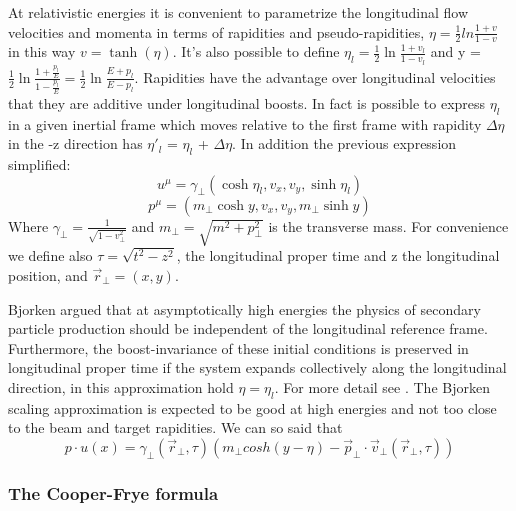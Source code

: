 \documentclass[12pt,a4paper]{book}
\begin{document}
	At relativistic energies it is convenient to parametrize the longitudinal flow velocities and momenta in terms of rapidities and pseudo-rapidities, $\eta= \frac{1}{2} ln \frac{1+v}{1-v}$ in this way $v = \tanh (\eta)$. It's also possible to define $\eta_l = \frac{1}{2} \ln \frac{1+v_l}{1-v_l}$ and y = $\frac{1}{2} \ln \frac{1+\frac{p_l}{E}}{1-\frac{p_l}{E}}= \frac{1}{2} \ln \frac{E+p_l}{E -p _l}$.  Rapidities have the advantage over longitudinal velocities that they are additive under longitudinal boosts. In fact is possible to express $\eta_l$ in a given inertial frame which moves relative to the first frame with rapidity $\Delta \eta$ in the -z direction has $\eta'_l$ = $\eta_l$ + $\Delta \eta$. In addition the previous expression simplified:
	\begin{equation}
		u^\mu=\gamma_\perp(\cosh \eta_l,v_x,v_y,\sinh \eta_l)
		\label{eq:4_velocity}
	\end{equation}
	\begin{equation}
		p^\mu=(m_\perp \cosh y,v_x,v_y, m_\perp \sinh y)
		\label{eq:4_momentum}
	\end{equation}
	Where $\gamma_\perp = \frac{1}{\sqrt{1-v_\perp^2}}$ and $m_\perp=\sqrt{m^2 + p_\perp^2}$ is the transverse mass. For convenience we define also $\tau=\sqrt{t^2-z^2}$, the longitudinal proper time and z the longitudinal position, and $\vec{r}_\perp=(x,y)$.
	
	Bjorken argued that at asymptotically high energies the physics of secondary particle production should be independent of the longitudinal reference frame. Furthermore, the boost-invariance of these initial conditions is preserved in longitudinal proper time if the system expands collectively along the longitudinal direction, in this approximation hold $\eta=\eta_l$. For more detail see \cite{PhysRevD.27.140}. The Bjorken scaling approximation is expected to be good at high energies and not too close to the beam and target rapidities. We can so said that
	\begin{equation}
		p \cdot u(x) = \gamma_\perp(\vec{r}_\perp, \tau) \left(m_\perp cosh(y-\eta) - \vec{p}_\perp \cdot \vec{v}_\perp(\vec{r}_\perp, \tau) \right)
		\label{eq:p*u}
	\end{equation}
	
	\subsubsection{The Cooper-Frye formula}
	
\end{document}
